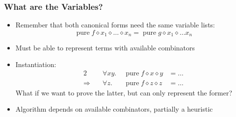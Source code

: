\documentclass[smaller,leqno]{beamer}
\DeclareMathOperator{\pure}{pure}
\newcommand{\ap}{\diamond}
\begin{document}
\begin{frame}
\frametitle{What are the Variables?}

\begin{itemize}
\item Remember that both canonical forms need the same variable lists:
\[ \pure f \ap x_1 \ap \dots \ap x_n = \pure g \ap x_1 \ap \dots x_n \]
\item Must be able to represent terms with available combinators
\item Instantiation:
\begin{alignat*}{2}
	& \forall x y. \; & \pure f \ap x \ap y &= \dots \\
	\Longrightarrow\quad & \forall z. \; & \pure f \ap z \ap z &= \dots
\end{alignat*}
What if we want to prove the latter, but can only represent the former?
\item Algorithm depends on available combinators, partially a heuristic
\end{itemize}
\end{frame}
\end{document}
